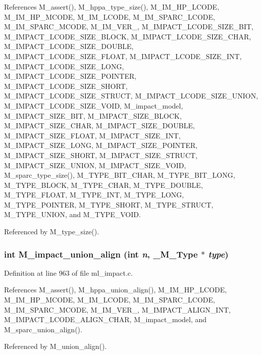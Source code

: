 References M\_\-assert(), M\_\-hppa\_\-type\_\-size(), M\_\-IM\_\-HP\_\-LCODE, M\_\-IM\_\-HP\_\-MCODE, M\_\-IM\_\-LCODE, M\_\-IM\_\-SPARC\_\-LCODE, M\_\-IM\_\-SPARC\_\-MCODE, M\_\-IM\_\-VER\_, M\_\-IMPACT\_\-LCODE\_\-SIZE\_\-BIT, M\_\-IMPACT\_\-LCODE\_\-SIZE\_\-BLOCK, M\_\-IMPACT\_\-LCODE\_\-SIZE\_\-CHAR, M\_\-IMPACT\_\-LCODE\_\-SIZE\_\-DOUBLE, M\_\-IMPACT\_\-LCODE\_\-SIZE\_\-FLOAT, M\_\-IMPACT\_\-LCODE\_\-SIZE\_\-INT, M\_\-IMPACT\_\-LCODE\_\-SIZE\_\-LONG, M\_\-IMPACT\_\-LCODE\_\-SIZE\_\-POINTER, M\_\-IMPACT\_\-LCODE\_\-SIZE\_\-SHORT, M\_\-IMPACT\_\-LCODE\_\-SIZE\_\-STRUCT, M\_\-IMPACT\_\-LCODE\_\-SIZE\_\-UNION, M\_\-IMPACT\_\-LCODE\_\-SIZE\_\-VOID, M\_\-impact\_\-model, M\_\-IMPACT\_\-SIZE\_\-BIT, M\_\-IMPACT\_\-SIZE\_\-BLOCK, M\_\-IMPACT\_\-SIZE\_\-CHAR, M\_\-IMPACT\_\-SIZE\_\-DOUBLE, M\_\-IMPACT\_\-SIZE\_\-FLOAT, M\_\-IMPACT\_\-SIZE\_\-INT, M\_\-IMPACT\_\-SIZE\_\-LONG, M\_\-IMPACT\_\-SIZE\_\-POINTER, M\_\-IMPACT\_\-SIZE\_\-SHORT, M\_\-IMPACT\_\-SIZE\_\-STRUCT, M\_\-IMPACT\_\-SIZE\_\-UNION, M\_\-IMPACT\_\-SIZE\_\-VOID, M\_\-sparc\_\-type\_\-size(), M\_\-TYPE\_\-BIT\_\-CHAR, M\_\-TYPE\_\-BIT\_\-LONG, M\_\-TYPE\_\-BLOCK, M\_\-TYPE\_\-CHAR, M\_\-TYPE\_\-DOUBLE, M\_\-TYPE\_\-FLOAT, M\_\-TYPE\_\-INT, M\_\-TYPE\_\-LONG, M\_\-TYPE\_\-POINTER, M\_\-TYPE\_\-SHORT, M\_\-TYPE\_\-STRUCT, M\_\-TYPE\_\-UNION, and M\_\-TYPE\_\-VOID.

Referenced by M\_\-type\_\-size().
\subsubsection{\setlength{\rightskip}{0pt plus 5cm}int M\_\-impact\_\-union\_\-align (int {\em n}, \bf{\_\-M\_\-Type} $\ast$ {\em type})}\label{m__impact_8h_2e5cd8e5ebff2487d4335bf77585cbf3}




Definition at line 963 of file ml\_\-impact.c.

References M\_\-assert(), M\_\-hppa\_\-union\_\-align(), M\_\-IM\_\-HP\_\-LCODE, M\_\-IM\_\-HP\_\-MCODE, M\_\-IM\_\-LCODE, M\_\-IM\_\-SPARC\_\-LCODE, M\_\-IM\_\-SPARC\_\-MCODE, M\_\-IM\_\-VER\_, M\_\-IMPACT\_\-ALIGN\_\-INT, M\_\-IMPACT\_\-LCODE\_\-ALIGN\_\-CHAR, M\_\-impact\_\-model, and M\_\-sparc\_\-union\_\-align().

Referenced by M\_\-union\_\-align().
